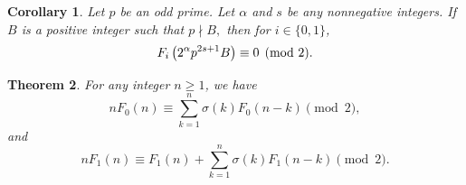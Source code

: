 \documentclass[12pt]{article}
\numberwithin{equation}{section}
\newtheorem{theorem}{Theorem}[section]
\newtheorem{corollary}[theorem]{Corollary}
\theoremstyle{definition}
\theoremstyle{remark}
\numberwithin{equation}{section}
\begin{document}
\begin{corollary}
Let $p$ be an odd prime. Let $\alpha$ and $s$ be any nonnegative integers. If $B$ is a positive integer such that $p\nmid B,$ then for $i\in\{0,1\}$, 
\begin{equation}
F_i\left(2^\alpha p^{2s+1}B\right)\equiv0\pmod{2}.\notag
\end{equation}
\end{corollary}
\begin{theorem}
For any integer $n\geq 1$, we have
\begin{equation}\label{L1}
nF_0(n)\equiv \sum_{k=1}^{n}\sigma(k)F_0(n-k) \pmod 2,
\end{equation}
and
\begin{equation}\label{L2}
nF_1(n)\equiv F_1(n)+\sum_{k=1}^{n}\sigma(k)F_1(n-k) \pmod 2.
\end{equation}
\end{theorem}
\end{document}
